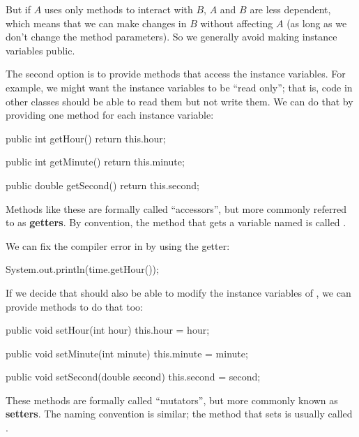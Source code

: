 
But if $A$ uses only methods to interact with $B$, $A$ and $B$ are less dependent, which means that we can make changes in $B$ without affecting $A$ (as long as we don't change the method parameters).
So we generally avoid making instance variables public.

The second option is to provide methods that access the instance variables.
For example, we might want the instance variables to be ``read only''; that is, code in other classes should be able to read them but not write them.
We can do that by providing one method for each instance variable:

\begin{code}
public int getHour() {
    return this.hour;
}

public int getMinute() {
    return this.minute;
}

public double getSecond() {
    return this.second;
}
\end{code}


Methods like these are formally called ``accessors'', but more commonly referred to as {\bf getters}.
By convention, the method that gets a variable named  is called .

We can fix the compiler error in  by using the getter:

\begin{code}
System.out.println(time.getHour());
\end{code}

If we decide that  should also be able to modify the instance variables of , we can provide methods to do that too:

\begin{code}
public void setHour(int hour) {
    this.hour = hour;
}

public void setMinute(int minute) {
    this.minute = minute;
}

public void setSecond(double second) {
    this.second = second;
}
\end{code}


These methods are formally called ``mutators'', but more commonly known as {\bf setters}.
The naming convention is similar; the method that sets  is usually called .

